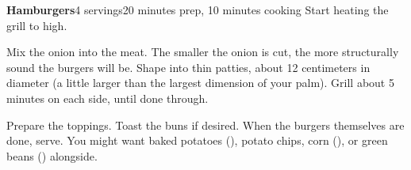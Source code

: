 \documentclass[../Cookbook.tex]{subfiles}
\begin{document}
\begin{recipe}{\textbf{Hamburgers}}{4 servings}{20 minutes prep, 10 minutes cooking}
  Start heating the grill to high.

  Mix the onion into the meat. The smaller the onion is cut, the more structurally sound the burgers will be.
  Shape into thin patties, about 12 centimeters in diameter (a little larger than the largest dimension of your palm).
  Grill about 5 minutes on each side, until done through.

  Prepare the toppings. Toast the buns if desired.
  When the burgers themselves are done, serve. You might want baked potatoes (\pageref{BakedPotato}), potato chips, corn (\pageref{Corn}), or green beans (\pageref{GreenBeans}) alongside.
\end{recipe}
\end{document}
